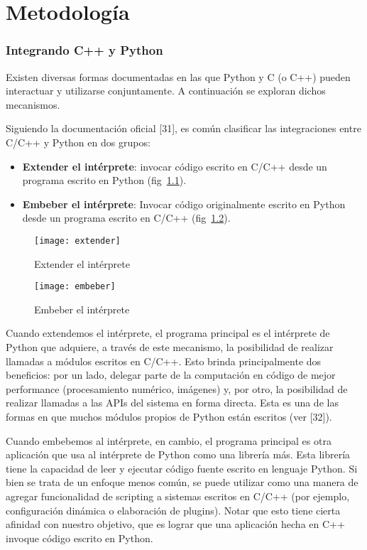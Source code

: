 \chapter{Metodología}\label{sec:met}

\subsection{Integrando C++ y Python}

Existen diversas formas documentadas en las que Python y C (o C++) pueden
interactuar y utilizarse conjuntamente. A continuación se exploran dichos
mecanismos.

Siguiendo la documentación oficial [31], es común clasificar las integraciones
entre C/C++ y Python en dos grupos:

\begin{itemize}
    \item \textbf{Extender el intérprete}: invocar código escrito en C/C++
desde un programa escrito en Python (fig~\ref{fig:extender}).

    \item \textbf{Embeber el intérprete}: Invocar código originalmente escrito
en Python desde un programa escrito en C/C++ (fig~\ref{fig:embeber}).
\end{itemize}

\begin{figure}[h]
\caption{Extender el intérprete}
\label{fig:extender}
\centering
\texttt{[image: extender]}
\end{figure}

\begin{figure}[h]
\caption{Embeber el intérprete}
\label{fig:embeber}
\centering
\texttt{[image: embeber]}
\end{figure}

Cuando extendemos el intérprete, el programa principal es el intérprete de
Python que adquiere, a través de este mecanismo, la posibilidad de realizar
llamadas a módulos escritos en C/C++. Esto brinda principalmente dos
beneficios: por un lado, delegar parte de la computación en código de mejor
performance (procesamiento numérico, imágenes) y, por otro, la posibilidad de
realizar llamadas a las APIs del sistema en forma directa. Esta es una de las
formas en que muchos módulos propios de Python están escritos (ver [32]).

Cuando embebemos al intérprete, en cambio, el programa principal es otra
aplicación que usa al intérprete de Python como una librería más. Esta librería
tiene la capacidad de leer y ejecutar código fuente escrito en lenguaje Python.
Si bien se trata de un enfoque menos común, se puede utilizar como una manera
de agregar funcionalidad de scripting a sistemas escritos en C/C++ (por
ejemplo, configuración dinámica o elaboración de plugins). Notar que esto tiene
cierta afinidad con nuestro objetivo, que es lograr que una aplicación hecha en
C++ invoque código escrito en Python.

